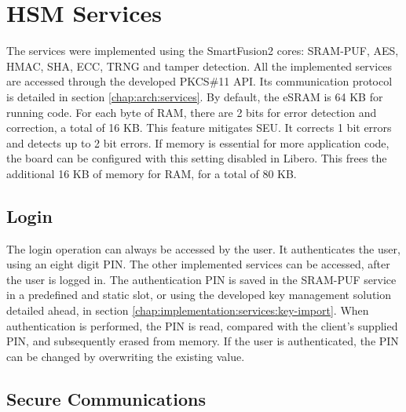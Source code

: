 
\section{HSM Services}\label{chap:implementation:services}

The services were implemented using the SmartFusion2 cores: SRAM-PUF, AES, HMAC, SHA, ECC, TRNG and tamper detection.
All the implemented services are accessed through the developed PKCS\#11 API. Its communication protocol is detailed in section \ref{chap:arch:services}.
By default, the eSRAM is 64 KB for running code. For each byte of \ac{RAM}, there are 2 bits for error detection and correction, a total of 16 KB. This feature mitigates SEU. It corrects 1 bit errors and detects up to 2 bit errors. If memory is essential for more application code, the board can be configured with this setting disabled in Libero. This frees the additional 16 KB of memory for RAM, for a total of 80 KB.

\subsection{Login}\label{chap:implementation:services:authentication}

The login operation can always be accessed by the user. It authenticates the user, using an eight digit PIN. The other implemented services can be accessed, after the user is logged in.
The authentication PIN is saved in the SRAM-PUF service in a predefined and static slot, or using the developed key management solution detailed ahead, in section \ref{chap:implementation:services:key-import}. When authentication is performed, the PIN is read, compared with the client's supplied PIN, and subsequently erased from memory.
If the user is authenticated, the PIN can be changed by overwriting the existing value.

\subsection{Secure Communications}\label{chap:implementation:services:secure}

